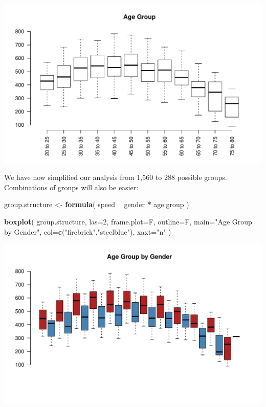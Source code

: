 \documentclass[]{book}
\newenvironment{Shaded}{\begin{snugshade}}{\end{snugshade}}
\newcommand{\DataTypeTok}[1]{\textcolor[rgb]{0.13,0.29,0.53}{#1}}
\newcommand{\DecValTok}[1]{\textcolor[rgb]{0.00,0.00,0.81}{#1}}
\newcommand{\KeywordTok}[1]{\textcolor[rgb]{0.13,0.29,0.53}{\textbf{#1}}}
\newcommand{\NormalTok}[1]{#1}
\newcommand{\OperatorTok}[1]{\textcolor[rgb]{0.81,0.36,0.00}{\textbf{#1}}}
\newcommand{\StringTok}[1]{\textcolor[rgb]{0.31,0.60,0.02}{#1}}
\theoremstyle{definition}
\theoremstyle{definition}
\theoremstyle{definition}
\theoremstyle{remark}
\begin{document}
\begin{center}\includegraphics[width=0.7\linewidth]{DS4PS-I_files/figure-latex/unnamed-chunk-118-1} \end{center}

We have now simplified our analysis from 1,560 to 288 possible groups.
Combinations of groups will also be easier:

\begin{Shaded}
\begin{Highlighting}[]

\NormalTok{group.structure <-}\StringTok{ }\KeywordTok{formula}\NormalTok{( speed }\OperatorTok{~}\StringTok{ }\NormalTok{gender }\OperatorTok{*}\StringTok{ }\NormalTok{age.group )}

\KeywordTok{boxplot}\NormalTok{( group.structure, }
         \DataTypeTok{las=}\DecValTok{2}\NormalTok{, }\DataTypeTok{frame.plot=}\NormalTok{F, }\DataTypeTok{outline=}\NormalTok{F, }\DataTypeTok{main=}\StringTok{"Age Group by Gender"}\NormalTok{,}
         \DataTypeTok{col=}\KeywordTok{c}\NormalTok{(}\StringTok{"firebrick"}\NormalTok{,}\StringTok{"steelblue"}\NormalTok{), }\DataTypeTok{xaxt=}\StringTok{"n"}\NormalTok{ )}
\end{Highlighting}
\end{Shaded}

\begin{center}\includegraphics[width=0.7\linewidth]{DS4PS-I_files/figure-latex/unnamed-chunk-119-1} \end{center}
\end{document}
